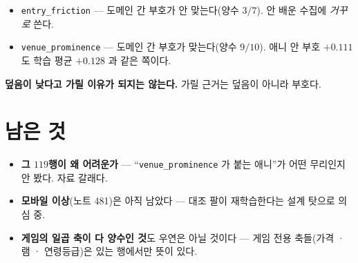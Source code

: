 \documentclass[11pt]{article}
\begin{document}
\begin{itemize}
\item \texttt{entry\_friction} --- 도메인 간 부호가 안 맞는다(양수 $3/7$).
안 배운 수집에 \emph{거꾸로} 쓴다.
\item \texttt{venue\_prominence} --- 도메인 간 부호가 맞는다(양수
$9/10$). 애니 안 부호 $+0.111$ 도 학습 평균 $+0.128$ 과 같은 쪽이다.
\end{itemize}

\textbf{덮음이 낮다고 가릴 이유가 되지는 않는다.} 가릴 근거는 덮음이
아니라 부호다.

\section*{남은 것}

\begin{itemize}
\item \textbf{그 $119$행이 왜 어려운가} --- ``\texttt{venue\_prominence}
가 붙는 애니''가 어떤 무리인지 안 봤다. 자료 갈래다.
\item \textbf{모바일 이상}(노트 481)은 아직 남았다 --- 대조 팔이
재학습한다는 설계 탓으로 의심 중.
\item \textbf{게임의 일곱 축이 다 양수인 것}도 우연은 아닐 것이다 ---
게임 전용 축들(가격 · 램 · 연령등급)은 있는 행에서만 뜻이 있다.
\end{itemize}
\end{document}
